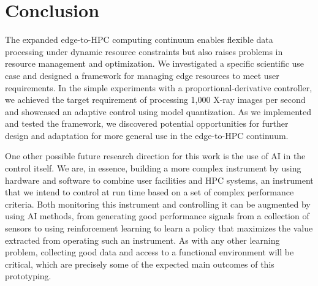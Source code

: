 \section{Conclusion}
\label{sec:conclusion}

The expanded edge-to-HPC computing continuum enables flexible data processing under dynamic resource constraints but also raises  problems in resource management and optimization. We investigated a specific scientific use case and designed a framework for managing edge resources to meet user requirements. In the simple experiments with a proportional-derivative controller, we achieved the target requirement of processing 1,000 X-ray images per second and showcased an adaptive control using model quantization. As we implemented and tested the framework, we discovered potential opportunities for further design and adaptation for more general use in the edge-to-HPC continuum.

One other possible future research direction for this work is the use of AI in the control itself. We are, in essence, building a more complex instrument by using hardware and software to combine user facilities and HPC systems, an instrument that we intend to control at run time based on a set of complex performance criteria. Both monitoring this instrument and controlling it can be augmented by using AI methods, from generating good performance signals from a collection of sensors to using reinforcement learning to learn a policy that maximizes the value extracted from operating such an instrument. As with any other learning problem, collecting good data and access to a functional environment will be critical, which are precisely some of the expected main outcomes of this prototyping.

%




